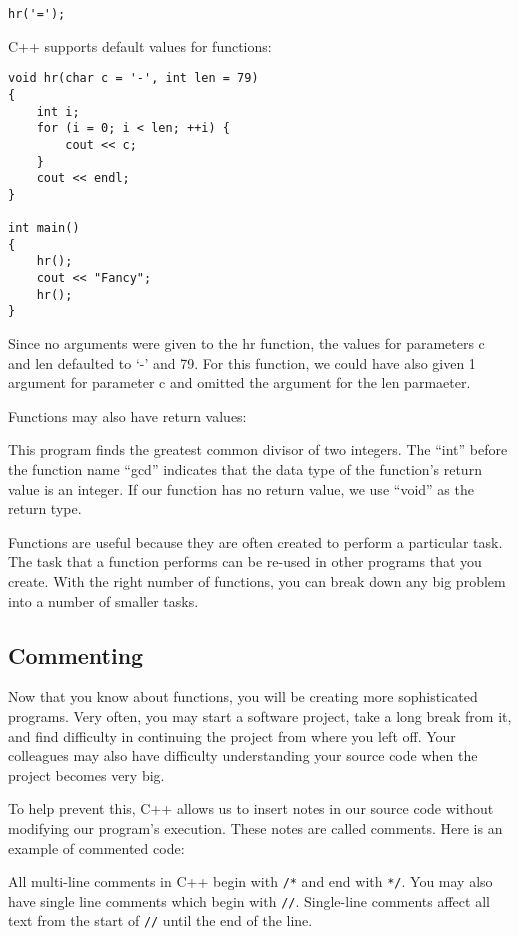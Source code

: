 \documentclass[a4paper,12pt]{article}
\begin{document}
\begin{lstlisting}
hr('=');
\end{lstlisting}

C++ supports default values for functions:

\begin{lstlisting}
void hr(char c = '-', int len = 79)
{
	int i;
	for (i = 0; i < len; ++i) {
		cout << c;
	}
	cout << endl;
}

int main()
{
	hr();
	cout << "Fancy";
	hr();
}
\end{lstlisting}

Since no arguments were given to the hr function, the values for parameters c and len defaulted to `-' and 79. For this function, we could have also given 1 argument for parameter c and omitted the argument for the len parmaeter.

Functions may also have return values:



This program finds the greatest common divisor of two integers. The ``int'' before the function name ``gcd'' indicates that the data type of the function's return value is an integer. If our function has no return value, we use ``void'' as the return type.

Functions are useful because they are often created to perform a particular task. The task that a function performs can be re-used in other programs that you create. With the right number of functions, you can break down any big problem into a number of smaller tasks.

\subsection*{Commenting}

Now that you know about functions, you will be creating more sophisticated programs. Very often, you may start a software project, take a long break from it, and find difficulty in continuing the project from where you left off. Your colleagues may also have difficulty understanding your source code when the project becomes very big. 

To help prevent this, C++ allows us to insert notes in our source code without modifying our program's execution. These notes are called comments. Here is an example of commented code:

\newpage



\newpage

All multi-line comments in C++ begin with \texttt{/*} and end with \texttt{*/}. You may also have single line comments which begin with \texttt{//}. Single-line comments affect all text from the start of \texttt{//} until the end of the line.
\end{document}
